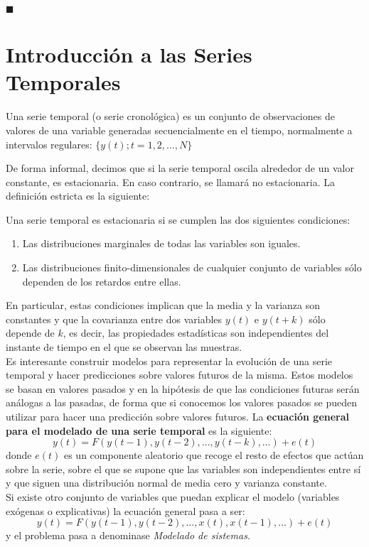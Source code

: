 \begin{flushright}
$\blacksquare$
\end{flushright}

\section{Introducción a las Series Temporales}

\begin{definicion}
Una serie temporal (o serie cronológica) es un conjunto de observaciones de valores de una variable generadas secuencialmente en el tiempo, normalmente a intervalos regulares: $\{y(t); t=1,2,\dots, N\}$
\end{definicion}

De forma informal, decimos que si la serie temporal oscila alrededor de un valor constante, es estacionaria. En caso contrario, se llamará no estacionaria. La definición estricta es la siguiente:
\begin{definicion}
Una serie temporal es estacionaria si se cumplen las dos siguientes condiciones:
\begin{enumerate}
\item Las distribuciones marginales de todas las variables son iguales.
\item Las distribuciones finito-dimensionales de cualquier conjunto de variables sólo dependen de los retardos entre ellas.
\end{enumerate}
\end{definicion}
En particular, estas condiciones implican que la media y la varianza son constantes y que la covarianza entre dos variables $y(t)$ e $y(t+k)$ sólo depende de $k$, es decir, las propiedades estadísticas son independientes del instante de tiempo en el que se observan las muestras.\\


Es interesante construir modelos para representar la evolución de una serie temporal y hacer predicciones sobre valores futuros de la misma. Estos modelos se basan en valores pasados y en la hipótesis de que las condiciones futuras serán análogas a las pasadas, de forma que si conocemos los valores pasados se pueden utilizar para hacer una predicción sobre valores futuros. La \textbf{ecuación general para el modelado de una serie temporal} es la siguiente:
\[	y(t) = F(y(t-1), y(t-2), \dots, y(t-k), \dots) + e(t)	\]
donde $e(t)$ es un componente aleatorio que recoge el resto de efectos que actúan sobre la serie, sobre el que se supone que las variables son independientes entre sí y que siguen una distribución normal de media cero y varianza constante.\\
Si existe otro conjunto de variables que puedan explicar el modelo (variables exógenas o explicativas) la ecuación general pasa a ser:
\[	y(t) = F(y(t-1), y(t-2), \dots, x(t), x(t-1), \dots) + e(t)	\]
y el problema pasa a denominase \textit{Modelado de sistemas}.\\

